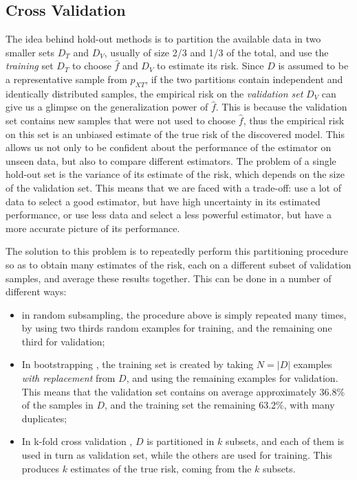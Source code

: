 \documentclass[12pt]{book}
\begin{document}
\subsection{Cross Validation}
\label{sec:cv}
The idea behind hold-out methods is to partition the available data in two smaller sets $D_T$ and $D_V$, usually of size 2/3 and 1/3 of the total, and use the \emph{training} set $D_T$ to choose $\hat{f}$ and $D_V$ to estimate its risk. Since $D$ is assumed to be a representative sample from $p_{XT}$, if the two partitions contain independent and identically distributed samples, the empirical risk on the \emph{validation set} $D_V$ can give us a glimpse on the generalization power of $\hat{f}$. This is because the validation set contains new samples that were not used to choose $\hat{f}$, thus the empirical risk on this set is an unbiased estimate of the true risk of the discovered model. This allows us not only to be confident about the performance of the estimator on unseen data, but also to compare different estimators. The problem of a single hold-out set is the variance of its estimate of the risk, which depends on the size of the validation set. This means that we are faced with a trade-off: use a lot of data to select a good estimator, but have high uncertainty in its estimated performance, or use less data and select a less powerful estimator, but have a more accurate picture of its performance.

The solution to this problem is to repeatedly perform this partitioning procedure so as to obtain many estimates of the risk, each on a different subset of validation samples, and average these results together. This can be done in a number of different ways:

\begin{itemize}
\item in random subsampling, the procedure above is simply repeated many times, by using two thirds random examples for training, and the remaining one third for validation;
\item In bootstrapping \citep{bootstrap}, the training set is created by taking $N=\vert D\vert$ examples \emph{with replacement} from $D$, and using the remaining examples for validation. This means that the validation set contains on average approximately 36.8\% of the samples in $D$, and the training set the remaining 63.2\%, with many duplicates;
\item In k-fold cross validation \citep{kfold}, $D$ is partitioned in $k$ subsets, and each of them is used in turn as validation set, while the others are used for training. This produces $k$ estimates of the true risk, coming from the $k$ subsets.
\end{itemize}
\end{document}
